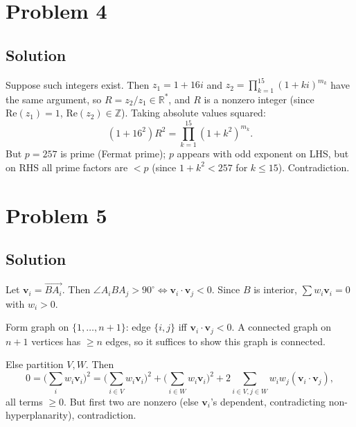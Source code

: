 \documentclass{article}
\begin{document}
\section*{Problem 4}
\subsection*{Solution}
Suppose such integers exist. Then $z_1 = 1 + 16 i$ and $z_2 = \prod_{k=1}^{15}(1+ki)^{m_k}$ have the same argument, so $R = z_2/z_1 \in \mathbb{R}^*$, and $R$ is a nonzero integer (since $\mathrm{Re}(z_1) = 1$, $\mathrm{Re}(z_2) \in \mathbb{Z}$). Taking absolute values squared:
\[ (1 + 16^2) R^2 = \prod_{k=1}^{15}(1+k^2)^{m_k}. \]
But $p = 257$ is prime (Fermat prime); $p$ appears with odd exponent on LHS, but on RHS all prime factors are $< p$ (since $1 + k^2 < 257$ for $k \le 15$). Contradiction.

\section*{Problem 5}
\subsection*{Solution}
Let $\mathbf{v}_i = \overrightarrow{BA_i}$. Then $\angle A_i B A_j > 90^\circ \iff \mathbf{v}_i \cdot \mathbf{v}_j < 0$. Since $B$ is interior, $\sum w_i \mathbf{v}_i = 0$ with $w_i > 0$.

Form graph on $\{1, \dots, n+1\}$: edge $\{i,j\}$ iff $\mathbf{v}_i \cdot \mathbf{v}_j < 0$. A connected graph on $n+1$ vertices has $\ge n$ edges, so it suffices to show this graph is connected.

Else partition $V, W$. Then
\[ 0 = \Big(\sum_i w_i \mathbf{v}_i\Big)^2 = \Big(\sum_{i \in V} w_i \mathbf{v}_i\Big)^2 + \Big(\sum_{i \in W} w_i \mathbf{v}_i\Big)^2 + 2\sum_{i \in V, j \in W} w_i w_j (\mathbf{v}_i \cdot \mathbf{v}_j), \]
all terms $\ge 0$. But first two are nonzero (else $\mathbf{v}_i$'s dependent, contradicting non-hyperplanarity), contradiction.
\end{document}
